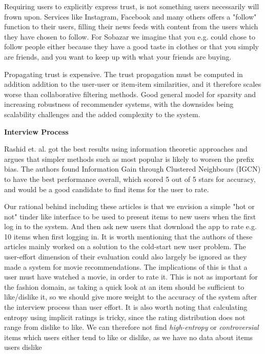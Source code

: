 Requiring users to explicitly express trust, is not something users necessarily will frown upon. Services like Instagram, Facebook and many others offers a "follow" function to their users, filling their news feeds with content from the users which they have chosen to follow. For Sobazar we imagine that you e.g. could chose to follow people either because they have a good taste in clothes or that you simply are friends, and you want to keep up with what your friends are buying.

Propagating trust is expensive. The trust propagation must be computed in addition addition to the user-user or item-item similarities, and it therefore scales worse than collaborative filtering methods. Good general model for sparsity and increasing robustness of recommender systems, with the downsides being scalability challenges and the added complexity to the system.\newline

\textbf{Interview Process}

Rashid et. al. \cite{Rashid2008} got the best results using information theoretic approaches and argues that simpler methods such as most popular is likely to worsen the prefix bias. The authors found Information Gain through Clustered Neighbours (IGCN) to have the best performance overall, which scored 5 out of 5 stars for accuracy, and would be a good candidate to find items for the user to rate.

Our rational behind including these articles is that we envision a simple "hot or not" tinder like interface to be used to present items to new users when the first log in to the system. And then ask new users that download the app to rate e.g. 10 items when first logging in. It is worth mentioning that the authors of these articles mainly worked on a solution to the cold-start new user problem. The user-effort dimension of their evaluation could also largely be ignored as they made a system for movie recommendations. The implications of this is that a user must have watched a movie, in order to rate it. This is not as important for the fashion domain, as taking a quick look at an item should be sufficient to like/dislike it, so we should give more weight to the accuracy of the system after the interview process than user effort. It is also worth noting that calculating entropy using implicit ratings is tricky, since the rating distribution does not range from dislike to like. We can therefore not find \emph{high-entropy} or \emph{controversial} items which users either tend to like or dislike, as we have no data about items users dislike %

